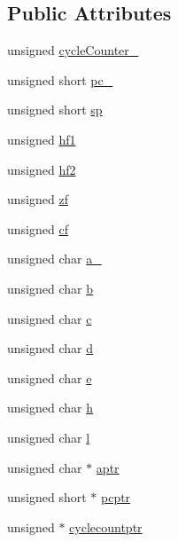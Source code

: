 \subsection*{Public Attributes}
\begin{DoxyCompactItemize}
\item 
unsigned \hyperlink{classgambatte_1_1CPU_a63875d3faf72d71639da644a3fdbabe2}{cycle\+Counter\+\_\+}
\item 
unsigned short \hyperlink{classgambatte_1_1CPU_a162b1b47d04dd8521353d3c2f86fbaed}{pc\+\_\+}
\item 
unsigned short \hyperlink{classgambatte_1_1CPU_a518896e2142a44b6c2be55e4be2d1c47}{sp}
\item 
unsigned \hyperlink{classgambatte_1_1CPU_ae3b6398537e00db41d1fc007bf814032}{hf1}
\item 
unsigned \hyperlink{classgambatte_1_1CPU_a767fa7cb6570274cdd1cdd2017557d4a}{hf2}
\item 
unsigned \hyperlink{classgambatte_1_1CPU_a720d6cffbef783bffb05b52e6d220cc8}{zf}
\item 
unsigned \hyperlink{classgambatte_1_1CPU_af22b6ed5e4abe327d5c1fda37a5592e4}{cf}
\item 
unsigned char \hyperlink{classgambatte_1_1CPU_a901efef7987513500fa7343c460a0c57}{a\+\_\+}
\item 
unsigned char \hyperlink{classgambatte_1_1CPU_a67c289f70c04730082c65b31bf4cb539}{b}
\item 
unsigned char \hyperlink{classgambatte_1_1CPU_ae0169f1c4073ae7935a9b7f3240746cb}{c}
\item 
unsigned char \hyperlink{classgambatte_1_1CPU_a1aa5ba5b3e842ecf507aab3e1124bd70}{d}
\item 
unsigned char \hyperlink{classgambatte_1_1CPU_a9ea5d749b2223a01b627e4241eeb36bf}{e}
\item 
unsigned char \hyperlink{classgambatte_1_1CPU_a00ae3d50ec2efbcbfc64626a4f1c0643}{h}
\item 
unsigned char \hyperlink{classgambatte_1_1CPU_aacbce3359a278632fc12e770766bafe8}{l}
\item 
unsigned char $\ast$ \hyperlink{classgambatte_1_1CPU_ad512e0efcb4a8626891e1bc7ece21299}{aptr}
\item 
unsigned short $\ast$ \hyperlink{classgambatte_1_1CPU_ac751baf8d8b71f3c98419dd4446b4771}{pcptr}
\item 
unsigned $\ast$ \hyperlink{classgambatte_1_1CPU_a1fb3ea4d34a5288044f67002b8f76cd8}{cyclecountptr}
\end{DoxyCompactItemize}
